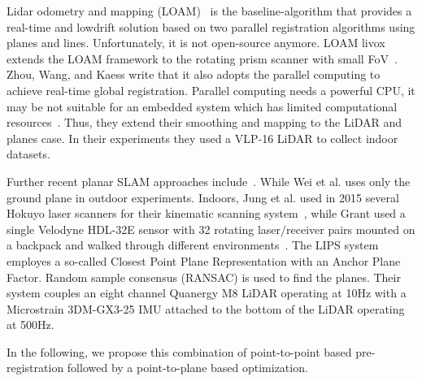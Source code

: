 Lidar odometry and mapping (LOAM)~\cite{Zhang2014} is the baseline-algorithm that provides a real-time and lowdrift solution based on two parallel registration algorithms using planes and lines.
Unfortunately, it is not open-source anymore.
LOAM livox extends the LOAM framework to the rotating prism scanner with small FoV~\cite{Lin_2020}.
Zhou, Wang, and Kaess write that it also adopts the parallel computing to achieve real-time global registration.
Parallel computing needs a powerful CPU, it may be not suitable for an embedded system which has limited computational resources~\cite{Zhou_2021}.
Thus, they extend their smoothing and mapping to the LiDAR and planes case.
In their experiments they used a VLP-16 LiDAR to collect indoor datasets.

Further recent planar SLAM approaches include~\cite{Jung_2015,Grant_2018,Geneva_2018, Zhou_2021,   wei2021groundslam}.
While Wei et al. uses only the ground plane in outdoor experiments.
Indoors, Jung et al. used in 2015 several Hokuyo laser scanners for their kinematic scanning system~\cite{Jung_2015}, while Grant used a single Velodyne HDL-32E sensor with 32 rotating laser/receiver pairs mounted on a backpack and walked through different environments~\cite{Grant_2018}.
The LIPS system~\cite{Geneva_2018} employes a so-called Closest Point Plane Representation with an Anchor Plane Factor.
Random sample consensus (RANSAC) is used to find the planes.
Their system couples an eight channel Quanergy M8 LiDAR operating at 10Hz with a Microstrain 3DM-GX3-25 IMU attached to the bottom of the LiDAR operating at 500Hz.

\bigskip

In the following, we propose this combination of point-to-point based pre-registration followed by a point-to-plane based optimization. 
